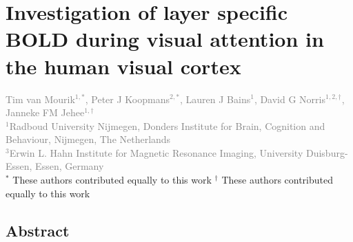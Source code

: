 
\chapter{Investigation of layer specific BOLD during visual attention in the human visual cortex}
\label{ch:attention}

\textcolor{gray}{{Tim van Mourik$^{1,*}$}, Peter J Koopmans$^{2,*}$, Lauren J Bains$^{1}$, David G Norris$^{1,2,\dagger}$, Janneke FM Jehee$^{1,\dagger}$\\
$^{1}$Radboud University Nijmegen, Donders Institute for Brain, Cognition and Behaviour, Nijmegen, The Netherlands \\
$^{3}$Erwin L. Hahn Institute for Magnetic Resonance Imaging, University Duisburg-Essen, Essen, Germany}\\

$^*$ 		{These authors contributed equally to this work}
$^\dagger$  {These authors contributed equally to this work}


\newpage
\section*{Abstract}

\newpage








